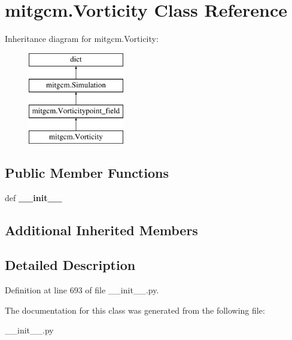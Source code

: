 \hypertarget{classmitgcm_1_1Vorticity}{}\section{mitgcm.\+Vorticity Class Reference}
\label{classmitgcm_1_1Vorticity}
Inheritance diagram for mitgcm.\+Vorticity\+:\begin{figure}[H]
\begin{center}
\leavevmode
\includegraphics[height=4.000000cm]{classmitgcm_1_1Vorticity}
\end{center}
\end{figure}
\subsection*{Public Member Functions}
\begin{DoxyCompactItemize}
\item 
\hypertarget{classmitgcm_1_1Vorticity_a6fdcf74ea42dc79b3b8eab1eb2a149e4}{}def {\bfseries \+\_\+\+\_\+init\+\_\+\+\_\+}\label{classmitgcm_1_1Vorticity_a6fdcf74ea42dc79b3b8eab1eb2a149e4}

\end{DoxyCompactItemize}
\subsection*{Additional Inherited Members}


\subsection{Detailed Description}


Definition at line 693 of file \+\_\+\+\_\+init\+\_\+\+\_\+.\+py.



The documentation for this class was generated from the following file\+:\begin{DoxyCompactItemize}
\item 
\+\_\+\+\_\+init\+\_\+\+\_\+.\+py\end{DoxyCompactItemize}
